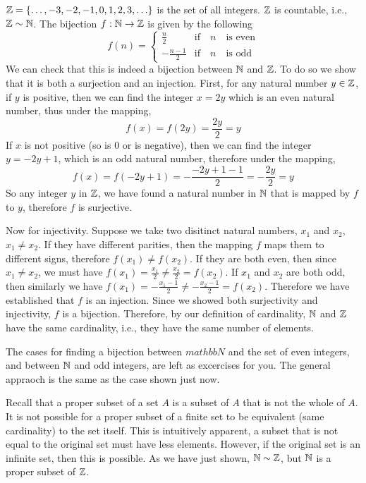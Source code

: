 \documentclass[../../templates/section]{subfiles}
\begin{document}
\begin{example}
$\mathbb{Z} = \{\ldots, -3, -2, -1, 0, 1, 2, 3, \ldots\}$ is the set of all integers.
$\mathbb{Z}$ is countable, i.e., $\mathbb{Z} \sim \mathbb{N}$. The bijection $f:\mathbb{N} \to \mathbb{Z}$ is
given by the following
\[ 
f(n) =
\begin{cases} 
    \frac{n}{2}      & \text{if} \quad n \quad \text{is even} \\
    -\frac{n - 1}{2} & \text{if} \quad n \quad \text{is odd}
\end{cases}
\]
We can check that this is indeed a bijection between $\mathbb{N}$ and $\mathbb{Z}$.  To do so
we show that it is both a surjection and an injection. First, for any natural
number $y\in \mathbb{Z}$, if $y$ is positive, then we can find the integer $x = 2y$
which is an even natural number, thus under the mapping,
\[
f(x) = f(2y) = \frac{2y}{2} = y
\]
If $x$ is not positive (so is 0 or is negative), then we can find the integer
$y = -2y + 1$, which is an odd natural number, therefore under the mapping,
\[
f(x) = f(-2y + 1) = -\frac{-2y + 1 - 1}{2} = -\frac{2y}{2} = y
\]
So any integer $y$ in $\mathbb{Z}$, we have found a natural number in $\mathbb{N}$ that is
mapped by $f$ to $y$, therefore $f$ is surjective.

Now for injectivity. Suppose we take two disitinct natural numbers, $x_1$ and
$x_2$, $x_1\neq x_2$. If they have different parities, then the mapping $f$
maps them to different signs, therefore $f(x_1)\neq f(x_2)$. If they are both
even, then since $x_1\neq x_2$, we must have $f(x_1) = \frac{x_1}{2}\neq
\frac{x_2}{2} = f(x_2)$. If $x_1$ and $x_2$ are both odd, then similarly we
have $f(x_1) = -\frac{x_1-1}{2}\neq -\frac{x_2-1}{2} = f(x_2)$. Therefore we
have established that $f$ is an injection. Since we showed both surjectivity
and injectivity, $f$ is a bijection. Therefore, by our definition of
cardinality, $\mathbb{N}$ and $\mathbb{Z}$ have the same cardinality, i.e., they have the same
number of elements.

The cases for finding a bijection between $mathbb{N}$ and the set of even
integers, and between $\mathbb{N}$ and odd integers, are left as excercises for you.
The general appraoch is the same as the case shown just now.
\end{example} 

\begin{remark}
Recall that a proper subset of a set $A$ is a subset of $A$ that is not the
whole of $A$.  It is not possible for a proper subset of a finite set to be
equivalent (same cardinality) to the set itself. This is intuitively apparent,
a subset that is not equal to the original set must have less elements.
However, if the original set is an infinite set, then this is possible. As we
have just shown, $\mathbb{N} \sim \mathbb{Z}$, but $\mathbb{N}$ is a proper subset of $\mathbb{Z}$.
\end{remark}
\end{document}
